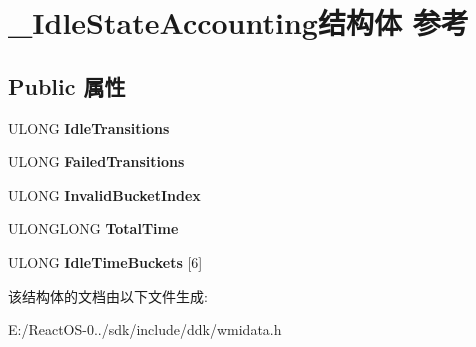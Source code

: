 \hypertarget{struct___idle_state_accounting}{}\section{\+\_\+\+Idle\+State\+Accounting结构体 参考}
\label{struct___idle_state_accounting}
\subsection*{Public 属性}
\begin{DoxyCompactItemize}
\item 
\mbox{\label{struct___idle_state_accounting_a1bff0206526b2a183803c63d4ea73db8}} 
U\+L\+O\+NG {\bfseries Idle\+Transitions}
\item 
\mbox{\label{struct___idle_state_accounting_a9081d156db2380f52d72bbd2caa4428c}} 
U\+L\+O\+NG {\bfseries Failed\+Transitions}
\item 
\mbox{\label{struct___idle_state_accounting_a3d6e53ec81584d86de875fe304cb3a42}} 
U\+L\+O\+NG {\bfseries Invalid\+Bucket\+Index}
\item 
\mbox{\label{struct___idle_state_accounting_ab1ee1f5b1a9608b2370124b73b72d7e8}} 
U\+L\+O\+N\+G\+L\+O\+NG {\bfseries Total\+Time}
\item 
\mbox{\label{struct___idle_state_accounting_ac9a8795e823e96e823906bb4a5bbfba7}} 
U\+L\+O\+NG {\bfseries Idle\+Time\+Buckets} \mbox{[}6\mbox{]}
\end{DoxyCompactItemize}


该结构体的文档由以下文件生成\+:\begin{DoxyCompactItemize}
\item 
E\+:/\+React\+O\+S-\/0../sdk/include/ddk/wmidata.\+h\end{DoxyCompactItemize}
